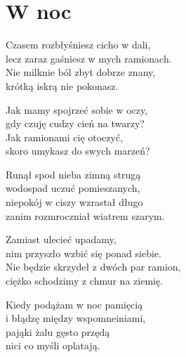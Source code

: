 \section{W noc}
\begin{text}
Czasem rozbłyśniesz cicho w dali,\\
lecz zaraz gaśniesz w mych ramionach.\\
Nie milknie ból zbyt dobrze znany,\\
krótką iskrą nie pokonasz.

Jak mamy spojrzeć sobie w oczy,\\
gdy czuję cudzy cień na twarzy?\\
Jak ramionami cię otoczyć,\\
skoro umykasz do swych marzeń?

Runął spod nieba zimną strugą\\
wodospad uczuć pomieszanych,\\
niepokój w ciszy wzrastał długo\\
zanim rozmroczniał wiatrem szarym.

Zamiast ulecieć upadamy,\\
nim przyszło wzbić się ponad siebie.\\
Nie będzie skrzydeł z dwóch par ramion,\\
ciężko schodzimy z chmur na ziemię.

Kiedy podążam w noc pamięcią\\
i błądzę między wspomneiniami,\\
pająki żalu gęsto przędą\\
nici co myśli oplatają.
\end{text}